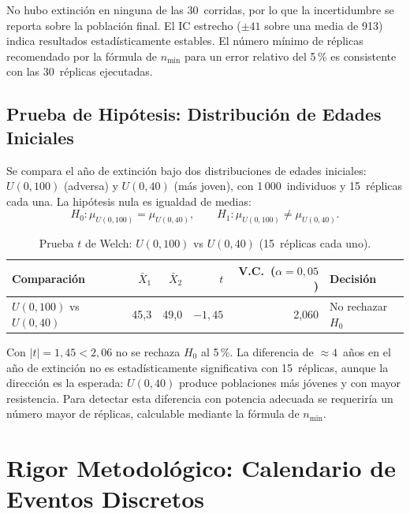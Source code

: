 \documentclass{llncs}
\begin{document}
No hubo extinción en ninguna de las 30~corridas, por lo que la incertidumbre
se reporta sobre la población final.
El IC estrecho ($\pm 41$ sobre una media de 913) indica resultados
estadísticamente estables.
El número mínimo de réplicas recomendado por la fórmula de $n_{\min}$ para
un error relativo del 5\,\% es consistente con las 30~réplicas ejecutadas.

\subsection{Prueba de Hipótesis: Distribución de Edades Iniciales}
\label{sec:hipotesis}

Se compara el año de extinción bajo dos distribuciones de edades iniciales:
$U(0,100)$ (adversa) y $U(0,40)$ (más joven), con 1\,000~individuos y
15~réplicas cada una.
La hipótesis nula es igualdad de medias:
\[
  H_0: \mu_{U(0,100)} = \mu_{U(0,40)}, \qquad
  H_1: \mu_{U(0,100)} \ne \mu_{U(0,40)}.
\]

\begin{table}[H]
\caption{Prueba $t$ de Welch: $U(0,100)$ vs $U(0,40)$ (15~réplicas cada uno).}
\label{tab:hipotesis}
\centering
\begin{tabular}{lrrrrl}
\toprule
\textbf{Comparación} & $\bar{X}_1$ & $\bar{X}_2$ & $t$ &
\textbf{V.C.\ ($\alpha{=}0{,}05$)} & \textbf{Decisión} \\
\midrule
$U(0,100)$ vs $U(0,40)$ & 45{,}3 & 49{,}0 & $-1{,}45$ & 2{,}060 & No rechazar $H_0$ \\
\bottomrule
\end{tabular}
\end{table}

Con $|t| = 1{,}45 < 2{,}06$ no se rechaza $H_0$ al 5\,\%.
La diferencia de $\approx 4$~años en el año de extinción no es
estadísticamente significativa con 15~réplicas, aunque la dirección es la
esperada: $U(0,40)$ produce poblaciones más jóvenes y con mayor resistencia.
Para detectar esta diferencia con potencia adecuada se requeriría un número
mayor de réplicas, calculable mediante la fórmula de $n_{\min}$.

\section{Rigor Metodológico: Calendario de Eventos Discretos}
\label{sec:fel}
\end{document}
